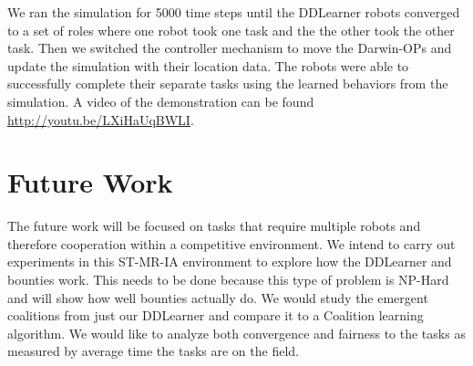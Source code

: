 \documentclass[twocolumn]{article}
\begin{document}
We ran the simulation for 5000 time steps until the DDLearner robots converged to a set of roles where one robot took one task and the the other took the other task.  Then we switched the controller mechanism to move the Darwin-OPs and update the simulation with their location data.  The robots were able to successfully complete their separate tasks using the learned behaviors from the simulation.  A video of the demonstration can be found \url{http://youtu.be/LXiHaUqBWLI}.

\section{Future Work}
The future work will be focused on tasks that require multiple robots and therefore cooperation within a competitive environment.  We intend to carry out experiments in this ST-MR-IA environment to explore how the DDLearner and bounties work. This needs to be done because this type of problem is NP-Hard and will show how well bounties actually do.  We would study the emergent coalitions from just our DDLearner and compare it to a Coalition learning algorithm.  We would like to analyze both convergence and fairness to the tasks as measured by average time the tasks are on the field.



\end{document}
